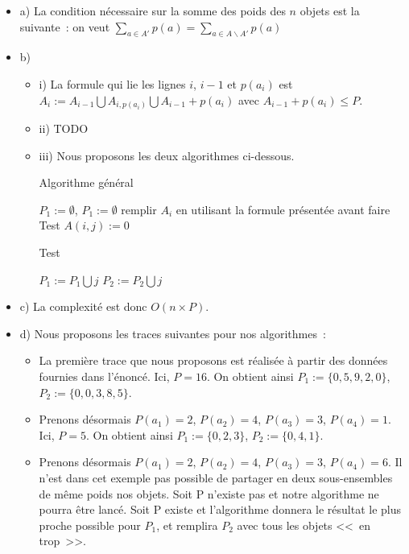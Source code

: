 \documentclass[a4paper, 12pt]{article}
\begin{document}
\begin{itemize}
\item a) La condition nécessaire sur la somme des poids des $n$ objets
  est la suivante~: on veut $\sum_{a \in A'} p(a)= \sum_{a \in A
    \backslash A'}p(a)$
\item b) 
\begin{itemize}
\item i) La formule qui lie les lignes $i$, $i-1$ et $p(a_i)$ est $A_i
  := A_{i-1} \bigcup A_{i, p(a_i)} \bigcup A_{i-1}+p(a_i)$ avec
  $A_{i-1}+p(a_i) \leq P$.
\item ii) TODO
\item iii) Nous proposons les deux algorithmes ci-dessous.
\begin{algorithm}[t]
\caption{Algorithme général}
\label{algoexo7}
\begin{algorithmic}[1]
\STATE $P_1 := \emptyset $,  $P_1 := \emptyset $
\STATE remplir $A_i$ en utilisant la formule présentée avant
\STATE faire Test
\STATE $A(i,j):=0$
\ENDIF
\ENDWHILE
\ENDFOR
\end{algorithmic}
\end{algorithm}

\begin{algorithm}[t]
\caption{Test}
\label{algoexo7test}
\begin{algorithmic}[1]
\STATE $P_1 := P_1 \bigcup j$
\ELSE
\STATE $P_2 := P_2 \bigcup j$
\ENDIF
\ENDFOR
\end{algorithmic}
\end{algorithm}
\end{itemize}

\item c) La complexité est donc $O(n\times P)$.
\item d) Nous proposons les traces suivantes pour nos algorithmes~:
\begin{itemize}
\item La première trace que nous proposons est réalisée à partir des
  données fournies dans l'énoncé. Ici, $P=16$. On obtient ainsi $P_1 := \{ 0, 5, 9,
  2, 0\}$, $P_2 := \{ 0, 0, 3, 8, 5\}$.
\item Prenons désormais $P(a_1)=2$, $P(a_2)=4$, $P(a_3)=3$,
  $P(a_4)=1$. Ici, $P=5$. On obtient ainsi  $P_1 := \{ 0, 2, 3\}$,
  $P_2 := \{ 0, 4, 1\}$.
\item Prenons désormais $P(a_1)=2$, $P(a_2)=4$, $P(a_3)=3$,
  $P(a_4)=6$. Il n'est dans cet exemple pas possible de partager en
  deux sous-ensembles de même poids nos objets. Soit P n'existe pas et
  notre algorithme ne pourra être lancé. Soit P existe et l'algorithme
  donnera le résultat le plus proche possible pour $P_1$, et remplira
  $P_2$ avec tous les objets <<~en trop~>>.
\end{itemize}
\end{itemize}
\end{document}
